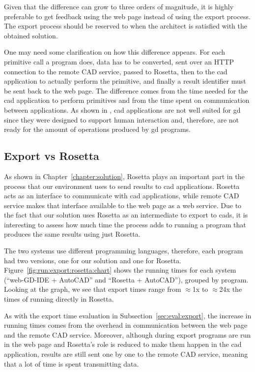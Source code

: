 Given that the difference can grow to three orders of magnitude, it is highly preferable to get feedback using the web page instead of using the export process.
The export process should be reserved to when the architect is satisfied with the obtained solution.

One may need some clarification on how this difference appears.
For each primitive call a program does, data has to be converted, sent over an HTTP connection to the remote CAD service, passed to Rosetta, then to the \gls{cad} application to actually perform the primitive, and finally a result identifier must be sent back to the web page.
The difference comes from the time needed for the \gls{cad} application to perform primitives and from the time spent on communication between applications.
As shown in \cite{Leitao2014illustrated}, \gls{cad} applications are not well suited for \gls{gd} since they were designed to support human interaction and, therefore, are not ready for the amount of operations produced by \gls{gd} programs.


\subsection{Export vs Rosetta}
As shown in Chapter~\ref{chapter:solution}, Rosetta plays an important part in the process that our environment uses to send results to \gls{cad} applications.
Rosetta acts as an interface to communicate with \gls{cad} applications, while remote CAD service makes that interface available to the web page as a web service.
Due to the fact that our solution uses Rosetta as an intermediate to export to \glspl{cad}, it is interesting to assess how much time the process adds to running a program that produces the same results using just Rosetta.

The two systems use different programming languages, therefore, each program had two versions, one for our solution and one for Rosetta.
Figure~\ref{fig:run:export:rosetta:chart} shows the running times for each system (``web-GD-IDE + AutoCAD'' and ``Rosetta + AutoCAD''), grouped by program.
Looking at the graph, we see that export times range from $\approx$1x to $\approx$24x the times of running directly in Rosetta.

As with the export time evaluation in Subsection~\ref{sec:eval:export}, the increase in running times comes from the overhead in communication between the web page and the remote CAD service.
Moreover, although during export programs are run in the web page and Rosetta's role is reduced to make them happen in the \gls{cad} application, results are still sent one by one to the remote CAD service, meaning that a lot of time is spent transmitting data.

